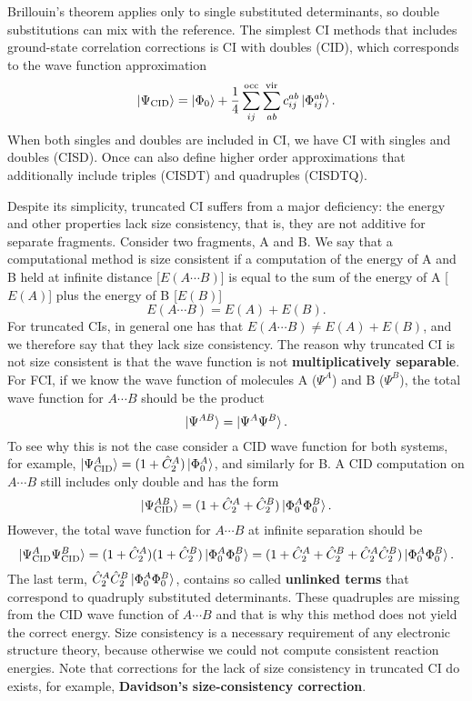 \documentclass[../Main/chem532-notes.tex]{subfiles}
\begin{document}
Brillouin's theorem applies only to single substituted determinants, so double substitutions can mix with the reference.
The simplest CI methods that includes ground-state correlation corrections is CI with doubles (CID), which corresponds to the wave function approximation
\begin{equation}
\ket{\Psi_{\mathrm{CID}}} = 
\ket{\Phi_0}
+ \frac{1}{4} \sum_{ij}^{\mathrm{occ}} \sum_{ab}^{\mathrm{vir}} c_{ij}^{ab} \ket{\Phi_{ij}^{ab}} .
\end{equation}
When both singles and doubles are included in CI, we have CI with singles and doubles (CISD). Once can also define higher order approximations that additionally include triples (CISDT) and quadruples (CISDTQ).

Despite its simplicity, truncated CI suffers from a major deficiency: the energy and other properties lack size consistency, that is, they are not additive for separate fragments.
Consider two fragments, A and B. We say that a computational method is size consistent if a computation of the energy of A and B held at infinite distance [$E(A\cdots B)$] is equal to the sum of the energy of A [$E(A)$] plus the energy of B [$E(B)$]
\begin{equation}
E(A\cdots B) = E(A) + E(B).
\end{equation}
For truncated CIs, in general one has that $E(A\cdots B) \neq E(A) + E(B)$, and we therefore say that they lack size consistency.
The reason why truncated CI is not size consistent is that the wave function is not \textbf{multiplicatively separable}. For FCI, if we know the wave function of molecules A ($\Psi^A$) and B ($\Psi^B$), the total wave function for $A\cdots B$ should be the product
\begin{equation}
\ket{\Psi^{AB}} = \ket{\Psi^A\Psi^B}.
\end{equation}
To see why this is not the case consider a CID wave function for both systems, for example, $\ket{\Psi^A_\mathrm{CID}} = (1 + \hat{C}^A_2) \ket{\Phi_0^A}$, and similarly for B.
A CID computation on $A\cdots B$ still includes only double and has the form
\begin{equation}
\ket{\Psi^{AB}_\mathrm{CID}}
 =  (1 + \hat{C}^A_2 + \hat{C}^B_2) \ket{\Phi_0^A\Phi_0^B}.
\end{equation}
However, the total wave function for $A\cdots B$ at infinite separation should be
\begin{equation}
\ket{\Psi^A_\mathrm{CID} \Psi^B_\mathrm{CID}}
=  (1 + \hat{C}^A_2) (1 + \hat{C}^B_2) \ket{\Phi_0^A\Phi_0^B}
 =  (1 + \hat{C}^A_2 + \hat{C}^B_2 + \hat{C}^A_2\hat{C}^B_2) \ket{\Phi_0^A\Phi_0^B}.
\end{equation}
The last term, $\hat{C}^A_2\hat{C}^B_2 \ket{\Phi_0^A\Phi_0^B}$, contains so called \textbf{unlinked terms} that correspond to quadruply substituted determinants.
These quadruples are missing from the CID wave function of $A\cdots B$ and that is why this method does not yield the correct energy.
Size consistency is a necessary requirement of any electronic structure theory, because otherwise we could not compute consistent reaction energies.
Note that corrections for the lack of size consistency in truncated CI do exists, for example, \textbf{Davidson's size-consistency correction}.
\end{document}
